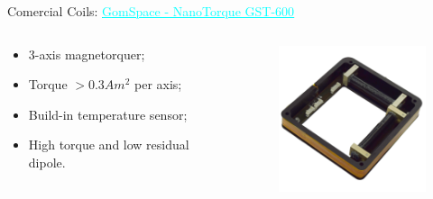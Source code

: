 \documentclass{beamer}
\begin{document}
\begin{frame}{Comercial Coils: \href{https://gomspace.com/shop/subsystems/attitude-orbit-control-systems/nanotorque-gst-600.aspx}{\textcolor{cyan}{\underline{GomSpace - NanoTorque GST-600}}}}

    \begin{columns}[t]
        \begin{column}[t]{0.5\textwidth}
            \begin{itemize}
                \item 3-axis magnetorquer;
                \item Torque $>0.3 Am^2$ per axis;
                \item Build-in temperature sensor;
                \item High torque and low residual dipole.
            \end{itemize}
        \end{column}
        \begin{column}[t]{0.5\textwidth}
            \begin{figure}[!ht]
                \begin{center}
                    \includegraphics[width=4.5cm]{figures/magnetorquers-gomspace.png}
                \end{center}
            \end{figure}
        \end{column}
    \end{columns}
    
\end{frame}

\end{document}
